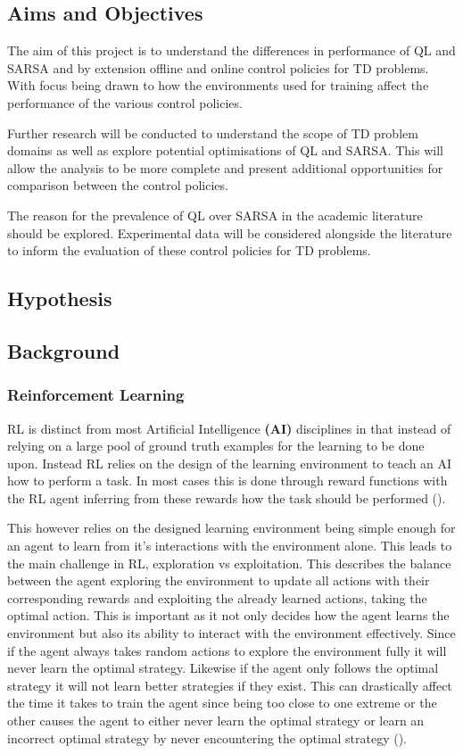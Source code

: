 \documentclass[10pt,journal]{IEEEtran}
\begin{document}
\subsection{Aims and Objectives}
The aim of this project is to understand the differences in performance of QL and SARSA and by extension offline and online control policies for TD problems. With focus being drawn to how the environments used for training affect the performance of the various control policies.

Further research will be conducted to understand the scope of TD problem domains as well as explore potential optimisations of QL and SARSA. This will allow the analysis to be more complete and present additional opportunities for comparison between the control policies.

The reason for the prevalence of QL over SARSA in the academic literature should be explored. Experimental data will be considered alongside the literature to inform the evaluation of these control policies for TD problems.

\subsection{Hypothesis}

\subsection{Background}

\subsubsection{Reinforcement Learning}
RL is distinct from most Artificial Intelligence \textbf{(AI)} disciplines in that instead of relying on a large pool of ground truth examples for the learning to be done upon. Instead RL relies on the design of the learning environment to teach an AI how to perform a task. In most cases this is done through reward functions with the RL agent inferring from these rewards how the task should be performed (\cite{Kaelbling}).

This however relies on the designed learning environment being simple enough for an agent to learn from it’s interactions with the environment alone. This leads to the main challenge in RL, exploration vs exploitation. This describes the balance between the agent exploring the environment to update all actions with their corresponding rewards and exploiting the already learned actions, taking the optimal action. This is important as it not only decides how the agent learns the environment but also its ability to interact with the environment effectively. Since if the agent always takes random actions to explore the environment fully it will never learn the optimal strategy. Likewise if the agent only follows the optimal strategy it will not learn better strategies if they exist. This can drastically affect the time it takes to train the agent since being too close to one extreme or the other causes the agent to either never learn the optimal strategy or learn an incorrect optimal strategy by never encountering the optimal strategy (\cite{Sutton}).
\end{document}
